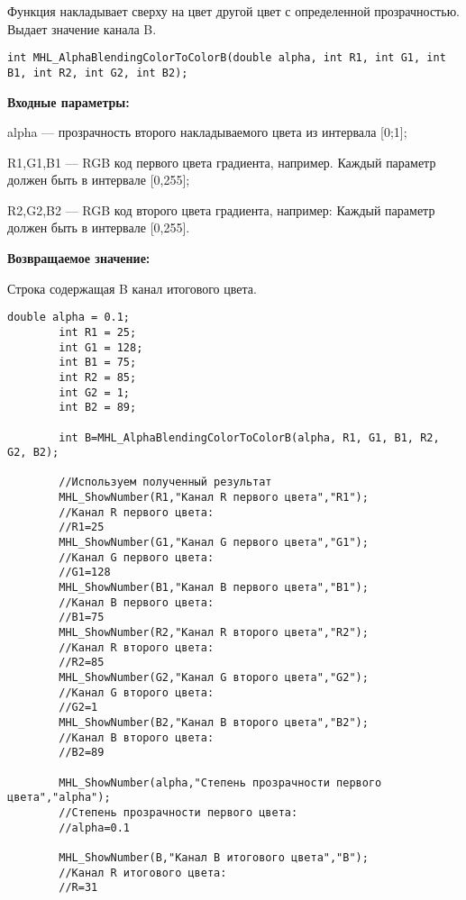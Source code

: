\documentclass[a4paper,12pt]{article}
\begin{document}
Функция накладывает сверху на цвет другой цвет с определенной прозрачностью. Выдает значение канала B.


\begin{lstlisting}[label=code_syntax_MHL_AlphaBlendingColorToColorB,caption=Синтаксис]
int MHL_AlphaBlendingColorToColorB(double alpha, int R1, int G1, int B1, int R2, int G2, int B2);
\end{lstlisting}

\textbf{Входные параметры:}  

alpha --- прозрачность второго накладываемого цвета из интервала [0;1];
 
    R1,G1,B1 --- RGB код первого цвета градиента, например. Каждый параметр должен быть в интервале [0,255];
 
    R2,G2,B2 --- RGB код второго цвета градиента, например: Каждый параметр должен быть в интервале [0,255].

\textbf{Возвращаемое значение:}

Строка содержащая B канал итогового цвета.


\begin{lstlisting}[label=code_use_MHL_AlphaBlendingColorToColorB,caption=Пример использования]
double alpha = 0.1;
        int R1 = 25;
        int G1 = 128;
        int B1 = 75;
        int R2 = 85;
        int G2 = 1;
        int B2 = 89;

        int B=MHL_AlphaBlendingColorToColorB(alpha, R1, G1, B1, R2, G2, B2);

        //Используем полученный результат
        MHL_ShowNumber(R1,"Канал R первого цвета","R1");
        //Канал R первого цвета:
        //R1=25
        MHL_ShowNumber(G1,"Канал G первого цвета","G1");
        //Канал G первого цвета:
        //G1=128
        MHL_ShowNumber(B1,"Канал B первого цвета","B1");
        //Канал B первого цвета:
        //B1=75
        MHL_ShowNumber(R2,"Канал R второго цвета","R2");
        //Канал R второго цвета:
        //R2=85
        MHL_ShowNumber(G2,"Канал G второго цвета","G2");
        //Канал G второго цвета:
        //G2=1
        MHL_ShowNumber(B2,"Канал B второго цвета","B2");
        //Канал B второго цвета:
        //B2=89

        MHL_ShowNumber(alpha,"Степень прозрачности первого цвета","alpha");
        //Степень прозрачности первого цвета:
        //alpha=0.1

        MHL_ShowNumber(B,"Канал B итогового цвета","B");
        //Канал R итогового цвета:
        //R=31
\end{lstlisting}
\end{document}
